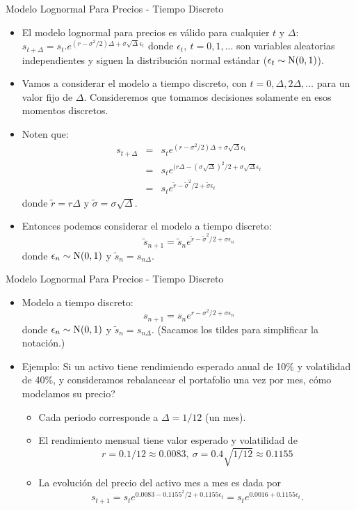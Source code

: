 \documentclass[handout]{beamer}
\begin{document}
\begin{frame}{Modelo Lognormal Para Precios - Tiempo Discreto}
\begin{itemize}
\item El modelo lognormal para precios es válido para cualquier $t$ y $\Delta$: $s_{t+\Delta} = s_t. e^{(r-\sigma^2/2)\Delta+\sigma\sqrt{\Delta}\epsilon_t}$
donde $\epsilon_t,~t = 0,1,...$ son variables aleatorias independientes y siguen la distribución normal estándar ($\epsilon_t \sim {\rm N}(0,1)$).
\item<2-> Vamos a considerar el modelo a tiempo discreto, con $t = 0, \Delta, 2\Delta,\dots$ para un valor fijo de $\Delta$. Consideremos que tomamos decisiones solamente en esos momentos discretos.
\item<3-> Noten que:
$$
\begin{array}{ccl}
s_{t+\Delta} & = & s_t e^{(r-\sigma^2/2)\Delta+\sigma\sqrt{\Delta}\epsilon_t} \\
& = & s_t e^{(r\Delta -(\sigma\sqrt{\Delta})^2/2+\sigma\sqrt{\Delta}\epsilon_t} \\
& = & s_t e^{\tilde{r}-\tilde\sigma^2/2+\tilde\sigma \epsilon_t}
\end{array}
$$
donde $\tilde r  = r \Delta$ y $\tilde \sigma = \sigma \sqrt{\Delta}$.
\item<4-> Entonces podemos considerar el modelo a tiempo discreto:
$$
\tilde s_{n+1} = \tilde s_n e^{\tilde r-\tilde \sigma^2/2+\sigma\epsilon_n}
$$
donde $\epsilon_n \sim {\rm N}(0,1)$ y $\tilde s_n = s_{n\Delta}$.
\end{itemize}
\end{frame}

\begin{frame}{Modelo Lognormal Para Precios - Tiempo Discreto}
\begin{itemize}
\item Modelo a tiempo discreto:
$$
s_{n+1} = s_n e^{r- \sigma^2/2+\sigma\epsilon_n}
$$
donde $\epsilon_n \sim {\rm N}(0,1)$ y $\tilde s_n = s_{n\Delta}$. (Sacamos los tildes para simplificar la notación.)
\item<2-> Ejemplo: Si un activo tiene rendimiendo esperado anual de 10\% y volatilidad de 40\%, y consideramos rebalancear el portafolio una vez por mes, cómo modelamos su precio?
\begin{itemize}
\item<3-> Cada periodo corresponde a $\Delta = 1/12$ (un mes).
\item<4-> El rendimiento mensual tiene valor esperado y volatilidad de
$$r = 0.1/12 \approx 0.0083,~\sigma = 0.4\sqrt{1/12} \approx 0.1155$$ 
\item<5-> La evolución del precio del activo mes a mes es dada por 
$$
s_{t+1} = s_te^{0.0083-0.1155^2/2+0.1155\epsilon_t} = s_te^{0.0016+0.1155\epsilon_t}.
$$
\end{itemize}
\end{itemize}
\end{frame}
\end{document}
